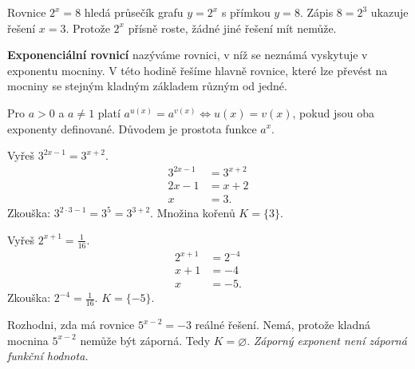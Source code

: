 \documentclass[11pt,a4paper]{article}
\begin{document}
Rovnice $2^x=8$ hledá průsečík grafu $y=2^x$ s přímkou $y=8$. Zápis $8=2^3$ ukazuje řešení $x=3$. Protože $2^x$ přísně roste, žádné jiné řešení mít nemůže.
\begin{definiceBox}[title={Definice - Exponenciální rovnice}]
\textbf{Exponenciální rovnicí} nazýváme rovnici, v níž se neznámá vyskytuje v exponentu mocniny. V této hodině řešíme hlavně rovnice, které lze převést na mocniny se stejným kladným základem různým od jedné.
\end{definiceBox}
\begin{zadaniBox}[title={Věta - Rovnost mocnin stejného základu}]
Pro $a>0$ a $a\ne1$ platí $a^{u(x)}=a^{v(x)}\iff u(x)=v(x)$, pokud jsou oba exponenty definované. Důvodem je prostota funkce $a^x$.
\end{zadaniBox}
\begin{prikladReseniBox}[title={Příklad 1}]
Vyřeš $3^{2x-1}=3^{x+2}$.
\tcblower
\[\begin{aligned}3^{2x-1}&=3^{x+2}\\2x-1&=x+2\\x&=3.\end{aligned}\]
Zkouška: $3^{2\cdot3-1}=3^5=3^{3+2}$. Množina kořenů $K=\{3\}$.
\end{prikladReseniBox}
\begin{prikladReseniBox}[title={Příklad 2}]
Vyřeš $2^{x+1}=\frac1{16}$.
\tcblower
\[\begin{aligned}2^{x+1}&=2^{-4}\\x+1&=-4\\x&=-5.\end{aligned}\]
Zkouška: $2^{-4}=\frac1{16}$. $K=\{-5\}$.
\end{prikladReseniBox}
\begin{prikladReseniBox}[title={Příklad 3}]
Rozhodni, zda má rovnice $5^{x-2}=-3$ reálné řešení.
\tcblower
Nemá, protože kladná mocnina $5^{x-2}$ nemůže být záporná. Tedy $K=\varnothing$. \emph{Záporný exponent není záporná funkční hodnota.}
\end{prikladReseniBox}
\end{document}

